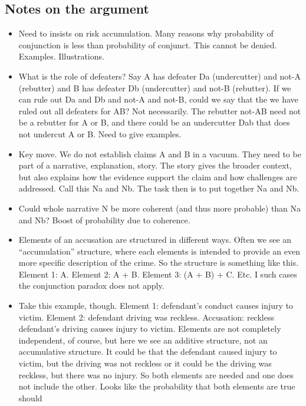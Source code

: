 \documentclass[
  10pt,
  dvipsnames,enabledeprecatedfontcommands]{scrartcl}
\begin{document}
\hypertarget{notes-on-the-argument}{%
\subsection{Notes on the argument}\label{notes-on-the-argument}}

\begin{itemize}
\item
  Need to insists on risk accumulation. Many reasons why probability of
  conjunction is less than probability of conjunct. This cannot be
  denied. Examples. Illustrations.
\item
  What is the role of defeaters? Say A has defeater Da (undercutter) and
  not-A (rebutter) and B has defeater Db (undercutter) and not-B
  (rebutter). If we can rule out Da and Db and not-A and not-B, could we
  say that the we have ruled out all defeaters for AB? Not necessarily.
  The rebutter not-AB need not be a rebutter for A or B, and there could
  be an undercutter Dab that does not undercut A or B. Need to give
  examples.
\item
  Key move. We do not establish claims A and B in a vacuum. They need to
  be part of a narrative, explanation, story. The story gives the
  broader context, but also explains how the evidence support the claim
  and how challenges are addressed. Call this Na and Nb. The task then
  is to put together Na and Nb.
\item
  Could whole narrative N be more coherent (and thus more probable) than
  Na and Nb? Boost of probability due to coherence.
\item
  Elements of an accusation are structured in different ways. Often we
  see an ``accumulation'' structure, where each elements is intended to
  provide an even more specific description of the crime. So the
  structure is something like this. Element 1: A. Element 2: A + B.
  Element 3: (A + B) + C. Etc. I such cases the conjunction paradox does
  not apply.
\item
  Take this example, though. Element 1: defendant's conduct causes
  injury to victim. Element 2: defendant driving was reckless.
  Accusation: reckless defendant's driving causes injury to victim.
  Elements are not completely independent, of course, but here we see an
  additive structure, not an accumulative structure. It could be that
  the defendant caused injury to victim, but the driving was not
  reckless or it could be the driving was reckless, but there was no
  injury. So both elements are needed and one does not include the
  other. Looks like the probability that both elements are true should

\end{itemize}
\end{document}
